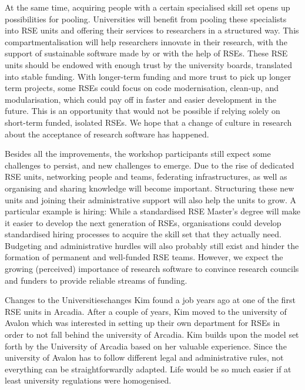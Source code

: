\documentclass{eceasst}
\begin{document}
At the same time, acquiring people with a certain specialised skill set
opens up possibilities for pooling.
Universities will benefit from pooling these specialists into RSE units
and offering their services to researchers in a structured way.
This compartmentalisation will help researchers innovate in their research,
with the support of sustainable software made by or with the help of RSEs.
These RSE units should be endowed with enough trust by the university boards, translated into stable funding.
With longer-term funding and more trust to pick up longer term projects,
some RSEs could focus on code modernisation, clean-up, and modularisation,
which could pay off in faster and easier development in the future.
This is an opportunity that would not be possible if relying solely on short-term funded, isolated RSEs.
We hope that a change of culture in research about the acceptance of research software has happened.

Besides all the improvements, the workshop participants still expect some challenges to persist,
and new challenges to emerge.
Due to the rise of dedicated RSE units, networking people and teams,
federating infrastructures, as well as organising and sharing knowledge will become important.
Structuring these new units and joining their administrative support will also help the units to grow.
A particular example is hiring:
While a standardised RSE Master's degree will make it easier to develop the next generation of RSEs,
organisations could develop standardised hiring processes to acquire the skill set that they actually need.
Budgeting and administrative hurdles will also probably still exist and hinder the formation of permanent and well-funded RSE teams.
However, we expect the growing (perceived) importance of research software
to convince research councils and funders to provide reliable streams of funding.

\begin{story}{Changes to the Universities}{changes}
Kim found a job years ago at one of the first RSE units in Arcadia. After a couple of years, Kim moved to the university of
Avalon which was interested in setting up their own department for RSEs in order to not fall behind the university of Arcadia.
Kim builds upon the model set forth by the University of Arcadia based on her valuable experience. Since the university
of Avalon has to follow different legal and administrative rules, not everything can be straightforwardly adapted.
Life would be so much easier if at least university regulations were homogenised.
\end{story}
\end{document}
